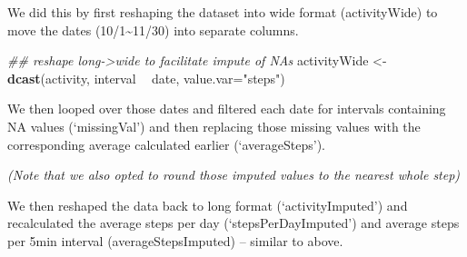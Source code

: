 \documentclass[]{article}
\newenvironment{Shaded}{\begin{snugshade}}{\end{snugshade}}
\newcommand{\CommentTok}[1]{\textcolor[rgb]{0.56,0.35,0.01}{\textit{#1}}}
\newcommand{\ControlFlowTok}[1]{\textcolor[rgb]{0.13,0.29,0.53}{\textbf{#1}}}
\newcommand{\DataTypeTok}[1]{\textcolor[rgb]{0.13,0.29,0.53}{#1}}
\newcommand{\DecValTok}[1]{\textcolor[rgb]{0.00,0.00,0.81}{#1}}
\newcommand{\KeywordTok}[1]{\textcolor[rgb]{0.13,0.29,0.53}{\textbf{#1}}}
\newcommand{\NormalTok}[1]{#1}
\newcommand{\OperatorTok}[1]{\textcolor[rgb]{0.81,0.36,0.00}{\textbf{#1}}}
\newcommand{\StringTok}[1]{\textcolor[rgb]{0.31,0.60,0.02}{#1}}
\begin{document}
We did this by first reshaping the dataset into wide format
(activityWide) to move the dates (10/1\textasciitilde{}11/30) into
separate columns.

\begin{Shaded}
\begin{Highlighting}[]
\CommentTok{## reshape long->wide to facilitate impute of NAs}
\NormalTok{activityWide <-}\StringTok{ }\KeywordTok{dcast}\NormalTok{(activity, interval }\OperatorTok{~}\StringTok{ }\NormalTok{date, }\DataTypeTok{value.var=}\StringTok{"steps"}\NormalTok{)}
\end{Highlighting}
\end{Shaded}

We then looped over those dates and filtered each date for intervals
containing NA values (`missingVal') and then replacing those missing
values with the corresponding average calculated earlier
(`averageSteps').

\emph{(Note that we also opted to round those imputed values to the
nearest whole step)}

\begin{Shaded}
\end{Shaded}

We then reshaped the data back to long format (`activityImputed') and
recalculated the average steps per day (`stepsPerDayImputed') and
average steps per 5min interval (averageStepsImputed) -- similar to
above.
\end{document}
